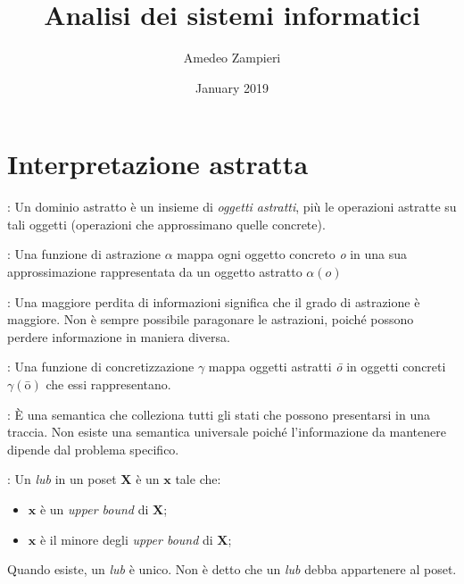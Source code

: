 \documentclass[a4paper, 10pt]{book}
\title{Analisi dei sistemi informatici}
\author{Amedeo Zampieri}
\date{January 2019}
\newenvironment{definition}[1][Definizione]{\begin{trivlist}
\item[\hskip \labelsep {\bfseries #1}]}{\end{trivlist}}
\begin{document}
\maketitle

\section{Interpretazione astratta}

    \begin{definition}[Dominio astratto]: Un dominio astratto è un insieme di \textit{oggetti astratti}, più le operazioni
            astratte su tali oggetti (operazioni che approssimano quelle concrete).
    \end{definition}
    
    \begin{definition}[Astrazione]: Una funzione di astrazione $\alpha$ mappa \textit{}{ogni} oggetto concreto \textit{o}
            in una sua approssimazione rappresentata da un oggetto astratto $\alpha(\textit{o})$
    \end{definition}
    
    \begin{definition}[Comparazione di astrazioni]: Una maggiore perdita di informazioni significa che il grado di
            astrazione è maggiore. Non è sempre possibile paragonare le astrazioni, poiché possono
            perdere informazione in maniera diversa.
    \end{definition}
    
    \begin{definition}[Concretizzazione]: Una funzione di concretizzazione $\gamma$ mappa oggetti astratti
        \textit{\={o}} in oggetti concreti $\gamma(\textit{\={o}})$ che essi rappresentano.
    \end{definition}
    
    \begin{definition}[Collecting semantics]: È una semantica che colleziona tutti gli stati che possono presentarsi
            in una traccia. Non esiste una semantica universale poiché l'informazione da mantenere dipende
            dal problema specifico.
    \end{definition}
    
    \begin{definition}[Least upper bound (\textbf{lub})]: Un \textit{lub} in un poset $\textbf{X}$ è un $\textbf{x}$ tale che:
            \begin{itemize}
                \item $\textbf{x}$ è un \textit{upper bound} di $\textbf{X}$;
                \item $\textbf{x}$ è il minore degli \textit{upper bound} di $\textbf{X}$;
            \end{itemize}
            Quando esiste, un \emph{lub} è unico. Non è detto che un \emph{lub} debba appartenere al
            poset.
    \end{definition}
    
\end{document}
